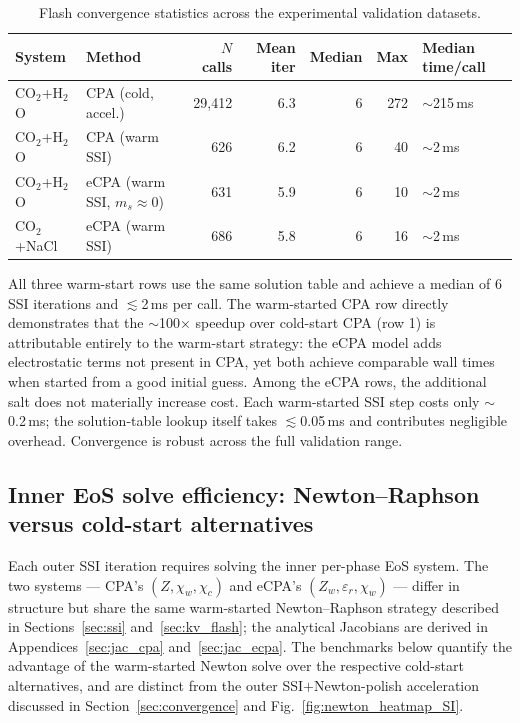 \documentclass[preprint,12pt,authoryear]{elsarticle}
\begin{document}
\begin{table}[H]
  \centering
  \caption{Flash convergence statistics across the experimental validation datasets.}
  \label{tab:convergence}
  \begin{tabular}{llrrrrl}
    \toprule
    System & Method & $N$ calls & Mean iter & Median & Max & Median time/call \\
    \midrule
    CO$_2$+H$_2$O  & CPA (cold, accel.)   & 29{,}412 &  6.3 &  6 & 272 & $\sim$215\,ms \\
    CO$_2$+H$_2$O  & CPA (warm SSI)       &    626   &  6.2 &  6 &  40 & $\sim$2\,ms   \\
    CO$_2$+H$_2$O  & eCPA (warm SSI, $m_s\!\approx\!0$) &    631   &  5.9 &  6 &  10 & $\sim$2\,ms   \\
    CO$_2$+NaCl    & eCPA (warm SSI)      &    686   &  5.8 &  6 &  16 & $\sim$2\,ms   \\
    \bottomrule
  \end{tabular}
\end{table}
All three warm-start rows use the same solution table and achieve a median of
6 SSI iterations and $\lesssim$2\,ms per call.
The warm-started CPA row directly demonstrates that the $\sim$100$\times$ speedup
over cold-start CPA (row 1) is attributable entirely to the warm-start strategy:
the eCPA model adds electrostatic terms not present in CPA, yet both achieve
comparable wall times when started from a good initial guess.
Among the eCPA rows, the additional salt does not materially increase cost.
Each warm-started SSI step costs only $\sim$0.2\,ms; the solution-table lookup
itself takes $\lesssim$0.05\,ms and contributes negligible overhead.
Convergence is robust across the full validation range.

\subsection{Inner EoS solve efficiency: Newton--Raphson versus cold-start alternatives}
\label{sec:inner_newton_perf}

Each outer SSI iteration requires solving the inner per-phase EoS system.
The two systems — CPA's $(Z, \chi_w, \chi_c)$ and eCPA's $(Z_w, \varepsilon_r, \chi_w)$
— differ in structure but share the same warm-started Newton--Raphson strategy
described in Sections~\ref{sec:ssi} and~\ref{sec:kv_flash};
the analytical Jacobians are derived in Appendices~\ref{sec:jac_cpa}
and~\ref{sec:jac_ecpa}.
The benchmarks below quantify the advantage of the warm-started Newton solve
over the respective cold-start alternatives, and are distinct from the outer
SSI$+$Newton-polish acceleration discussed in Section~\ref{sec:convergence}
and Fig.~\ref{fig:newton_heatmap_SI}.
\end{document}

